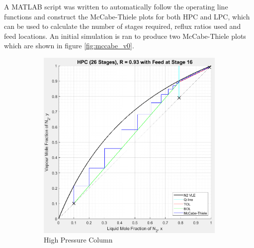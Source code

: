 \documentclass[11pt,oneside]{article}
\begin{document}
        \noindent A MATLAB script was written to automatically follow the operating line functions and construct the McCabe-Thiele plots for both HPC and LPC, which can be used to calculate the number of stages required, reflux ratios used and feed locations. An initial simulation is ran to produce two McCabe-Thiele plots which are shown in figure \ref{fig:mccabe_v0}.\\
        \begin{figure}[H]
            \begin{subfigure}{0.49\textwidth}
                \includegraphics[width=\linewidth]{HPC_v0.jpeg}
                \caption{High Pressure Column}
                \label{fig:HPC_v0}
            \end{subfigure}
            \hspace*{\fill} %
            \begin{subfigure}{0.49\textwidth}

\end{subfigure}
\end{figure}
\end{document}
